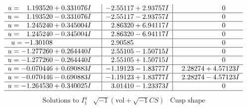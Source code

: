 \documentclass[1p]{elsarticle_modified}
\theoremstyle{definition}
\newcommand{\I}{\sqrt{-1}}
\begin{document}
$$\begin{array}{c|c|c}
\begin{aligned}
u &= \phantom{-}1.193520 + 0.331076 I\end{aligned}
 & -2.55117 + 2.93757 I & \phantom{-0.000000 } 0 \\ \hline\begin{aligned}
u &= \phantom{-}1.193520 - 0.331076 I\end{aligned}
 & -2.55117 - 2.93757 I & \phantom{-0.000000 } 0 \\ \hline\begin{aligned}
u &= \phantom{-}1.245240 + 0.345004 I\end{aligned}
 & \phantom{-}2.86320 + 6.94117 I & \phantom{-0.000000 } 0 \\ \hline\begin{aligned}
u &= \phantom{-}1.245240 - 0.345004 I\end{aligned}
 & \phantom{-}2.86320 - 6.94117 I & \phantom{-0.000000 } 0 \\ \hline\begin{aligned}
u &= -1.30108\phantom{ +0.000000I}\end{aligned}
 & \phantom{-}2.90585\phantom{ +0.000000I} & \phantom{-0.000000 } 0 \\ \hline\begin{aligned}
u &= -1.277260 + 0.264440 I\end{aligned}
 & \phantom{-}2.55105 - 1.50715 I & \phantom{-0.000000 } 0 \\ \hline\begin{aligned}
u &= -1.277260 - 0.264440 I\end{aligned}
 & \phantom{-}2.55105 + 1.50715 I & \phantom{-0.000000 } 0 \\ \hline\begin{aligned}
u &= -0.070446 + 0.690883 I\end{aligned}
 & -1.19123 - 1.83777 I & \phantom{-}2.28274 + 4.57123 I \\ \hline\begin{aligned}
u &= -0.070446 - 0.690883 I\end{aligned}
 & -1.19123 + 1.83777 I & \phantom{-}2.28274 - 4.57123 I \\ \hline\begin{aligned}
u &= -1.264530 + 0.340025 I\end{aligned}
 & \phantom{-}3.01410 - 1.23373 I & \phantom{-0.000000 } 0\\
 \hline 
 \end{array}$$\newpage$$\begin{array}{c|c|c}  
\text{Solutions to }I^u_{1}& \I (\text{vol} + \sqrt{-1}CS) & \text{Cusp shape}\\

\end{array}$$
\end{document}
